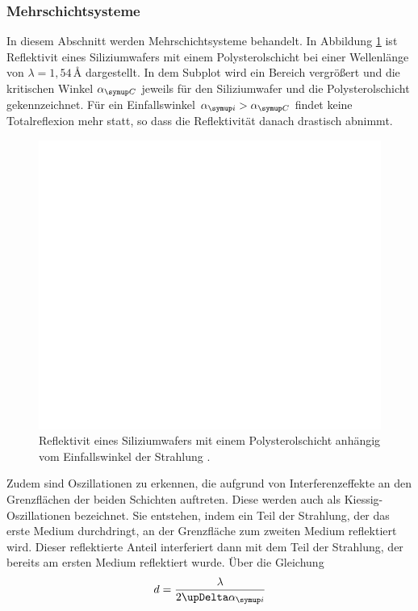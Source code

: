 \subsubsection{Mehrschichtsysteme}
In diesem Abschnitt werden Mehrschichtsysteme behandelt. In Abbildung \ref{fig:reflectivity} ist
Reflektivit eines Siliziumwafers mit einem Polysterolschicht bei einer Wellenlänge von $\lambda = 1,54\,\unit{\angstrom}$ dargestellt. 
In dem Subplot wird ein Bereich vergrößert und die kritischen Winkel $\alpha\idx{C}$ jeweils für den Siliziumwafer und die Polysterolschicht gekennzeichnet.
Für ein Einfallswinkel $\alpha\idx{i} > \alpha\idx{C}$ findet keine Totalreflexion mehr statt, so dass die Reflektivität danach drastisch abnimmt.
\begin{figure}[H]
  \centering
  \includegraphics[scale=1.2]{reflectivity_plot.pdf}
  \caption{Reflektivit eines Siliziumwafers mit einem Polysterolschicht anhängig vom Einfallswinkel der Strahlung \cite{tolan}.}
  \label{fig:reflectivity}
\end{figure}
\noindent
Zudem sind Oszillationen zu erkennen, die aufgrund von Interferenzeffekte an den Grenzflächen der beiden Schichten auftreten.
Diese werden auch als Kiessig-Oszillationen bezeichnet. Sie entstehen, indem ein Teil der Strahlung, der das erste Medium durchdringt, 
an der Grenzfläche zum zweiten Medium reflektiert wird. Dieser reflektierte Anteil interferiert dann mit dem Teil der Strahlung, der 
bereits am ersten Medium reflektiert wurde. Über die Gleichung 
\begin{equation}
d = \frac{\lambda}{2\upDelta \alpha\idx{i}}
\end{equation}
